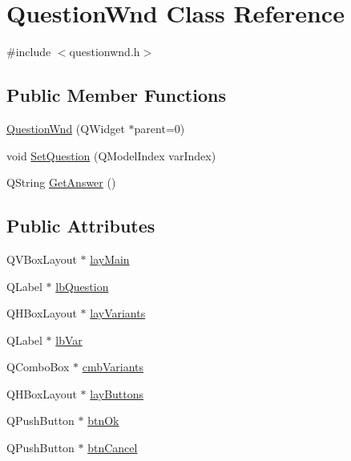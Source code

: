 \hypertarget{class_question_wnd}{
\section{QuestionWnd Class Reference}
\label{class_question_wnd}
}


{\ttfamily \#include $<$questionwnd.h$>$}

\subsection*{Public Member Functions}
\begin{DoxyCompactItemize}
\item 
\hyperlink{class_question_wnd_abfbcdd5b5ce27f027249bf6f2499d008}{QuestionWnd} (QWidget $\ast$parent=0)
\item 
void \hyperlink{class_question_wnd_a9066b2e1643006b9afb66d7ae3f9c430}{SetQuestion} (QModelIndex varIndex)
\item 
QString \hyperlink{class_question_wnd_a2011a6c391e399665606fc78d8b583f8}{GetAnswer} ()
\end{DoxyCompactItemize}
\subsection*{Public Attributes}
\begin{DoxyCompactItemize}
\item 
QVBoxLayout $\ast$ \hyperlink{class_question_wnd_a6f71d0746090cbab4b0940ea78580a6a}{layMain}
\item 
QLabel $\ast$ \hyperlink{class_question_wnd_a9d21de1eeed095229785ee0a0d5860fc}{lbQuestion}
\item 
QHBoxLayout $\ast$ \hyperlink{class_question_wnd_a711a0484b118a7c5010e1d88eda8bc2e}{layVariants}
\item 
QLabel $\ast$ \hyperlink{class_question_wnd_ae7c58d40e74ea2ea9135456ef55e158b}{lbVar}
\item 
QComboBox $\ast$ \hyperlink{class_question_wnd_a9c51d03b7798ae2c904bcb348a364200}{cmbVariants}
\item 
QHBoxLayout $\ast$ \hyperlink{class_question_wnd_a811bc74af624b7324280e0a7ef1518da}{layButtons}
\item 
QPushButton $\ast$ \hyperlink{class_question_wnd_a865ece947ae7cf9b28f442c8f48dc436}{btnOk}
\item 
QPushButton $\ast$ \hyperlink{class_question_wnd_ae018059487d2e6dccf8d62a353443919}{btnCancel}
\end{DoxyCompactItemize}


